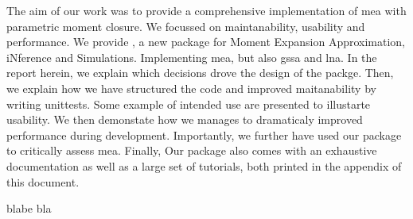The aim of our work was to provide a comprehensive implementation of \gls{mea} with parametric moment closure. 
We focussed on maintanability, usability and performance. 
We provide \means, a new \py{} package for Moment Expansion Approximation, iNference and Simulations.
Implementing \gls{mea}, but also \gls{gssa} and \gls{lna}. 
In the report herein, we explain which decisions drove the design of the packge. 
Then, we explain how we have structured the code and improved maitanability by writing unittests.
Some example of intended use are presented to illustarte usability.
We then demonstate how we manages to dramaticaly improved performance during development.
Importantly, we further have used our package to critically assess \gls{mea}.
Finally, Our package also comes with an exhaustive documentation as well as a large set of tutorials, both printed in the appendix of this document.


blabe bla \cite{ale_general_2013}

